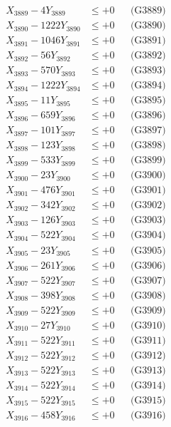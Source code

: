 \documentclass[a4paper,10pt]{article}
\begin{document}
{\begin{align}
X_{3889} - 4Y_{3889} &\leq +0 && \text{(G3889)} \\
X_{3890} - 1222Y_{3890} &\leq +0 && \text{(G3890)} \\
\allowbreak
X_{3891} - 1046Y_{3891} &\leq +0 && \text{(G3891)} \\
X_{3892} - 56Y_{3892} &\leq +0 && \text{(G3892)} \\
X_{3893} - 570Y_{3893} &\leq +0 && \text{(G3893)} \\
X_{3894} - 1222Y_{3894} &\leq +0 && \text{(G3894)} \\
X_{3895} - 11Y_{3895} &\leq +0 && \text{(G3895)} \\
X_{3896} - 659Y_{3896} &\leq +0 && \text{(G3896)} \\
X_{3897} - 101Y_{3897} &\leq +0 && \text{(G3897)} \\
X_{3898} - 123Y_{3898} &\leq +0 && \text{(G3898)} \\
X_{3899} - 533Y_{3899} &\leq +0 && \text{(G3899)} \\
X_{3900} - 23Y_{3900} &\leq +0 && \text{(G3900)} \\
\allowbreak
X_{3901} - 476Y_{3901} &\leq +0 && \text{(G3901)} \\
X_{3902} - 342Y_{3902} &\leq +0 && \text{(G3902)} \\
X_{3903} - 126Y_{3903} &\leq +0 && \text{(G3903)} \\
X_{3904} - 522Y_{3904} &\leq +0 && \text{(G3904)} \\
X_{3905} - 23Y_{3905} &\leq +0 && \text{(G3905)} \\
X_{3906} - 261Y_{3906} &\leq +0 && \text{(G3906)} \\
X_{3907} - 522Y_{3907} &\leq +0 && \text{(G3907)} \\
X_{3908} - 398Y_{3908} &\leq +0 && \text{(G3908)} \\
X_{3909} - 522Y_{3909} &\leq +0 && \text{(G3909)} \\
X_{3910} - 27Y_{3910} &\leq +0 && \text{(G3910)} \\
\allowbreak
X_{3911} - 522Y_{3911} &\leq +0 && \text{(G3911)} \\
X_{3912} - 522Y_{3912} &\leq +0 && \text{(G3912)} \\
X_{3913} - 522Y_{3913} &\leq +0 && \text{(G3913)} \\
X_{3914} - 522Y_{3914} &\leq +0 && \text{(G3914)} \\
X_{3915} - 522Y_{3915} &\leq +0 && \text{(G3915)} \\
X_{3916} - 458Y_{3916} &\leq +0 && \text{(G3916)} \\

\end{align}}
\end{document}
